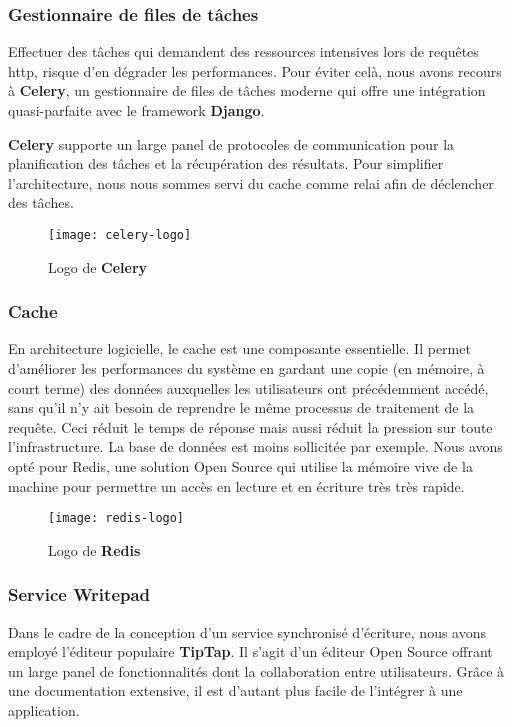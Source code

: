 \subsubsection{Gestionnaire de files de tâches}
Effectuer des tâches qui demandent des ressources intensives lors de requêtes \acrshort{http}, risque d’en dégrader les performances. 
Pour éviter celà, nous avons recours à \textbf{Celery}, un gestionnaire de files de tâches moderne qui offre une intégration quasi-parfaite avec le framework \textbf{Django}.

\textbf{Celery} supporte un large panel de protocoles de communication pour la planification des tâches et la récupération des résultats. 
Pour simplifier l’architecture, nous nous sommes servi du cache comme relai afin de déclencher des tâches.


\begin{figure}[H]
  \centering
  \texttt{[image: celery-logo]}
  \caption{Logo de \textbf{Celery}}
  \label{fig:celery_logo}
\end{figure}


\subsubsection{Cache}
En architecture logicielle, le cache est une composante essentielle. 
Il permet d'améliorer les performances du système en gardant une copie 
(en mémoire, à court terme) des données auxquelles les utilisateurs ont précédemment accédé,
sans qu’il n’y ait besoin de reprendre le même processus de traitement de la requête. 
Ceci réduit le temps de réponse mais aussi réduit la pression sur toute l’infrastructure. 
La base de données est moins sollicitée par exemple. Nous avons opté pour Redis, 
une solution Open Source qui utilise la mémoire vive de la machine pour permettre un accès en lecture 
et en écriture très très rapide.


\begin{figure}[H]
  \centering
  \texttt{[image: redis-logo]}
  \caption{Logo de \textbf{Redis}}
  \label{fig:redis_logo}
\end{figure}

\subsubsection{Service Writepad}
Dans le cadre de la conception d’un service synchronisé d'écriture, nous avons employé l'éditeur populaire \textbf{TipTap}. 
Il s’agit d’un éditeur Open Source offrant un large panel de fonctionnalités dont la collaboration entre utilisateurs. 
Grâce à une documentation extensive, il est d’autant plus facile de l'intégrer à une application.


